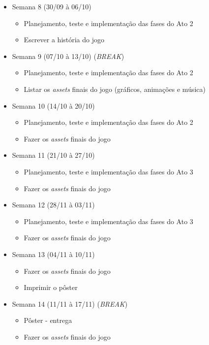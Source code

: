 \documentclass[a4paper, 11pt]{article}
\begin{document}
\begin{itemize}
\item Semana 8 (30/09 à 06/10)
 \begin{itemize} 
 \item Planejamento, teste e implementação das fases do Ato 2
 \item Escrever a história do jogo
 \end{itemize}

\item Semana 9 (07/10 à 13/10) (\textit{BREAK})
 \begin{itemize} 
 \item Planejamento, teste e implementação das fases do Ato 2 
 \item Listar os \textit{assets} finais do jogo (gráficos, animações e música)
 \end{itemize}

\item Semana 10 (14/10 à 20/10)
 \begin{itemize} 
 \item Planejamento, teste e implementação das fases do Ato 2
 \item Fazer os \textit{assets} finais do jogo
 \end{itemize}

\item Semana 11 (21/10 à 27/10) 
 \begin{itemize} 
 \item Planejamento, teste e implementação das fases do Ato 3
 \item Fazer os \textit{assets} finais do jogo
 \end{itemize}

\item Semana 12 (28/11 à 03/11)
 \begin{itemize} 
 \item Planejamento, teste e implementação das fases do Ato 3
 \item Fazer os \textit{assets} finais do jogo
 \end{itemize}

\item Semana 13 (04/11 à 10/11) 
 \begin{itemize} 
 \item Fazer os \textit{assets} finais do jogo 
 \item Imprimir o pôster
 \end{itemize}

\item Semana 14 (11/11 à 17/11) (\textit{BREAK})
 \begin{itemize} 
 \item Pôster - entrega
 \item Fazer os \textit{assets} finais do jogo
 \end{itemize}


\end{itemize}
\end{document}
